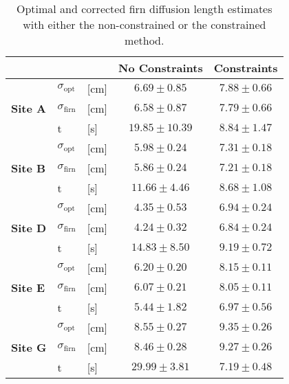 \documentclass[../../CompleteThesis2/Complete_2ndDraft]{subfiles}
\begin{document}
\begin{table}[ht]
	\centering
	\begin{tabular}{l l l | c | c}
		& & & No Constraints & Constraints\\[0.1cm]
		\hline
		\hline 
		\multirow{3}{*}{\textbf{Site A}} & $\sigma_{\text{opt}}$ & [cm] & $6.69 \pm 0.85$ & $7.88 \pm 0.66$\\[0.1cm]
		& $\sigma_{\text{firn}}$ & [cm] & $6.58 \pm 0.87$& $7.79\pm 0.66$\\[0.5cm]
		& t & [s] & $19.85\pm 10.39$ & $8.84\pm 1.47$ \\[0.1cm]
		\hline
		
		\multirow{3}{*}{\textbf{Site B}} & $\sigma_{\text{opt}}$ & [cm] & $5.98 \pm 0.24$ & $7.31 \pm 0.18$ \\[0.1cm]
		& $\sigma_{\text{firn}}$ & [cm] & $5.86 \pm 0.24$& $7.21\pm 0.18$\\[0.5cm]
		& t & [s] & $11.66 \pm 4.46$ & $8.68 \pm 1.08$\\[0.1cm]
		\hline
		
		\multirow{3}{*}{\textbf{Site D}} & $\sigma_{\text{opt}}$ & [cm] & $4.35 \pm 0.53$ & $6.94 \pm 0.24$ \\[0.1cm]
		& $\sigma_{\text{firn}}$ & [cm] &$4.24\pm 0.32$& $6.84\pm 0.24$\\[0.5cm]
		& t & [s] & $14.83\pm 8.50$& $9.19 \pm 0.72$\\[0.1cm]
		\hline
		
		\multirow{3}{*}{\textbf{Site E}} & $\sigma_{\text{opt}}$ & [cm] & $6.20 \pm 0.20$ & $8.15 \pm 0.11$ \\[0.1cm]
		& $\sigma_{\text{firn}}$ & [cm] & $6.07\pm 0.21$& $8.05\pm 0.11$ \\[0.5cm]
		& t & [s] & $5.44 \pm 1.82$ & $6.97 \pm 0.56$\\[0.1cm]
		\hline
		
		\multirow{3}{*}{\textbf{Site G}} & $\sigma_{\text{opt}}$ & [cm] & $8.55 \pm 0.27$ & $9.35 \pm 0.26$ \\[0.1cm]
		& $\sigma_{\text{firn}}$ & [cm] & $8.46 \pm 0.28$ & $9.27\pm 0.26$ \\[0.5cm]
		& t & [s] & $29.99 \pm 3.81$ & $7.19 \pm 0.48$\\[0.1cm]
		
		\hline
	\end{tabular}
	\caption[$\sigma$ Estimates Given Unconstrained and Constrained Method]{\small Optimal and corrected firn diffusion length estimates with either the non-constrained or the constrained method.}
	\label{Tab:diffLens_ConstVNoConst}
\end{table}
\end{document}
